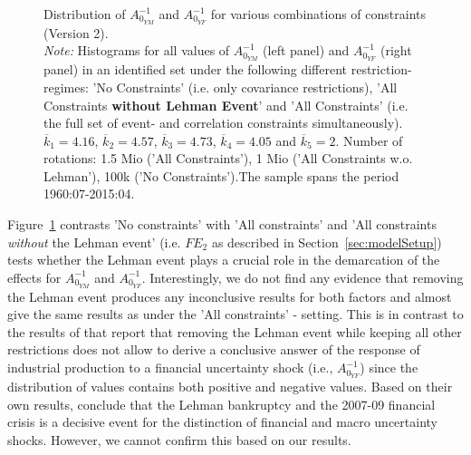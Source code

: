 \documentclass[a4paper,11pt,listof=nochaptergap,oneside,pointednumbers,bibtotoc,bigheadings,liststotoc,hidelinks]{scrbook}
\theoremstyle{mysatz}
\theoremstyle{mydefinition}
\theoremstyle{mytheorem}
\theoremstyle{mybemerkung}
\begin{document}
\begin{figure}[!h]
   \centering
   \setlength\fboxsep{0pt}
   \setlength\fboxrule{0pt}
      \caption[Distribution of $A_{0_{YM}}^{-1}$ and $A_{0_{YF}}^{-1}$ for various combinations of constraints (Version 2).]{Distribution of $A_{0_{YM}}^{-1}$ and $A_{0_{YF}}^{-1}$ for various combinations of constraints (Version 2).\\
      \textit{Note:} Histograms for all values of $A_{0_{YM}}^{-1}$ (left panel) and $A_{0_{YF}}^{-1}$ (right panel) in an identified set under the following different restriction-regimes: 'No Constraints' (i.e. only covariance restrictions), 'All Constraints \textbf{without Lehman Event}' and 'All Constraints' (i.e. the full set of event- and correlation constraints simultaneously). $\overline{k}_1 = 4.16$, $\overline{k}_2 = 4.57$, $\overline{k}_3 = 4.73$, $\overline{k}_4 = 4.05$ and $\overline{k}_5 = 2$. Number of rotations: 1.5 Mio ('All Constraints'), 1 Mio ('All Constraints w.o. Lehman'), 100k ('No Constraints').The sample spans the period 1960:07-2015:04.}   \label{fig:distribution_impact_matrices_type2}
\end{figure}

Figure~\ref{fig:distribution_impact_matrices_type2} contrasts 'No constraints' with 'All constraints' and 'All constraints \textit{without} the Lehman event' (i.e. $FE_2$ as described in Section~\ref{sec:modelSetup}) tests whether the Lehman event plays a crucial role in the demarcation of the effects for $A_{0_{YM}}^{-1}$ and $A_{0_{YF}}^{-1}$. Interestingly, we do not find any evidence that removing the Lehman event produces any inconclusive results for both factors and almost give the same results as under the 'All constraints' - setting. This is in contrast to the results of \citet{ludvigsonetal:19} that report that removing the Lehman event while keeping all other restrictions does not allow to derive a conclusive answer of the response of industrial production to a financial uncertainty shock (i.e., $A_{0_{YF}}^{-1}$) since the distribution of values contains both positive and negative values. Based on their own results, \citet{ludvigsonetal:19} conclude that the Lehman bankruptcy and the 2007-09 financial crisis is a decisive event for the distinction of financial and macro uncertainty shocks. However, we cannot confirm this based on our results.
\end{document}
